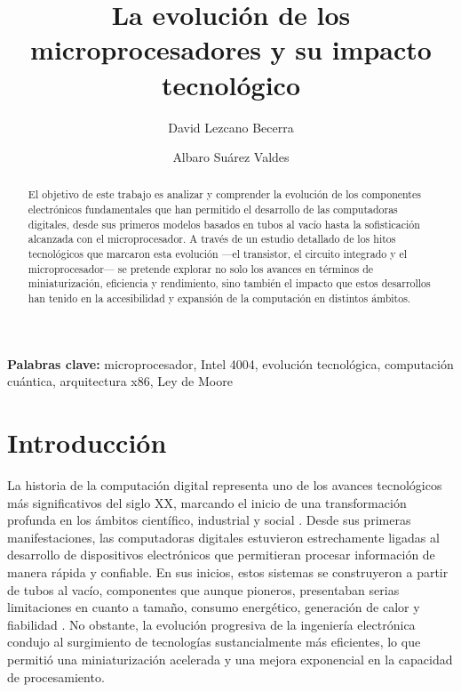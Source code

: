 \documentclass[]{article}
\title{La evolución de los microprocesadores y su impacto tecnológico}
\author{David Lezcano Becerra}
\author{Albaro Suárez Valdes}
\affil{Facultad de Matemática y Computación, Universidad de La Habana}
\begin{document}
\maketitle

\begin{abstract}
    El objetivo de este trabajo es analizar y comprender la evolución de los componentes electrónicos fundamentales que han permitido el desarrollo de las computadoras digitales, desde sus primeros modelos basados en tubos al vacío hasta la sofisticación alcanzada con el microprocesador. A través de un estudio detallado de los hitos tecnológicos que marcaron esta evolución —el transistor, el circuito integrado y el microprocesador— se pretende explorar no solo los avances en términos de miniaturización, eficiencia y rendimiento, sino también el impacto que estos desarrollos han tenido en la accesibilidad y expansión de la computación en distintos ámbitos.
\end{abstract}

\textbf{Palabras clave:} microprocesador, Intel 4004, evolución tecnológica, computación cuántica, arquitectura x86, Ley de Moore

\section{Introducción}
La historia de la computación digital representa uno de los avances tecnológicos más significativos del siglo XX, marcando el inicio de una transformación profunda en los ámbitos científico, industrial y social \cite{ceruzzi2003}. Desde sus primeras manifestaciones, las computadoras digitales estuvieron estrechamente ligadas al desarrollo de dispositivos electrónicos que permitieran procesar información de manera rápida y confiable. En sus inicios, estos sistemas se construyeron a partir de tubos al vacío, componentes que aunque pioneros, presentaban serias limitaciones en cuanto a tamaño, consumo energético, generación de calor y fiabilidad \cite{bowen1993}. No obstante, la evolución progresiva de la ingeniería electrónica condujo al surgimiento de tecnologías sustancialmente más eficientes, lo que permitió una miniaturización acelerada y una mejora exponencial en la capacidad de procesamiento.
\end{document}
